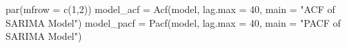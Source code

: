 \documentclass[
]{article}
\newenvironment{Shaded}{\begin{snugshade}}{\end{snugshade}}
\newcommand{\AttributeTok}[1]{\textcolor[rgb]{0.77,0.63,0.00}{#1}}
\newcommand{\DecValTok}[1]{\textcolor[rgb]{0.00,0.00,0.81}{#1}}
\newcommand{\FunctionTok}[1]{\textcolor[rgb]{0.00,0.00,0.00}{#1}}
\newcommand{\NormalTok}[1]{#1}
\newcommand{\OtherTok}[1]{\textcolor[rgb]{0.56,0.35,0.01}{#1}}
\newcommand{\StringTok}[1]{\textcolor[rgb]{0.31,0.60,0.02}{#1}}
\begin{document}
\begin{Shaded}
\begin{Highlighting}[]
\FunctionTok{par}\NormalTok{(}\AttributeTok{mfrow =} \FunctionTok{c}\NormalTok{(}\DecValTok{1}\NormalTok{,}\DecValTok{2}\NormalTok{))}
\NormalTok{model\_acf }\OtherTok{=} \FunctionTok{Acf}\NormalTok{(model, }\AttributeTok{lag.max =} \DecValTok{40}\NormalTok{, }\AttributeTok{main =} \StringTok{"ACF of SARIMA Model"}\NormalTok{)}
\NormalTok{model\_pacf }\OtherTok{=} \FunctionTok{Pacf}\NormalTok{(model, }\AttributeTok{lag.max =} \DecValTok{40}\NormalTok{, }\AttributeTok{main =} \StringTok{"PACF of SARIMA Model"}\NormalTok{)}
\end{Highlighting}
\end{Shaded}
\end{document}
